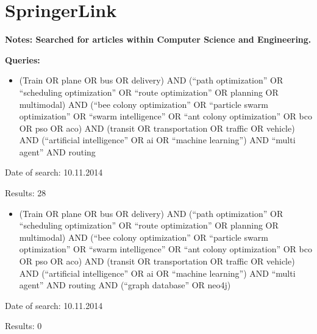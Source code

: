 \section{SpringerLink}
\textbf{Notes: Searched for articles within Computer Science and Engineering.}
\par
\textbf{Queries:}
\begin{itemize}
\item (Train OR plane OR bus OR delivery) AND (``path optimization'' OR ``scheduling optimization'' OR ``route optimization'' OR planning OR multimodal) AND (``bee colony optimization'' OR ``particle swarm optimization'' OR ``swarm intelligence'' OR ``ant colony optimization'' OR bco OR pso OR aco) AND (transit OR transportation OR traffic OR vehicle) AND (``artificial intelligence'' OR ai OR ``machine learning'') AND ``multi agent'' AND routing
\end{itemize}
\par Date of search: 10.11.2014
\par Results: 28
\begin{itemize}
\item (Train OR plane OR bus OR delivery) AND (``path optimization'' OR ``scheduling optimization'' OR ``route optimization'' OR planning OR multimodal) AND (``bee colony optimization'' OR ``particle swarm optimization'' OR ``swarm intelligence'' OR ``ant colony optimization'' OR bco OR pso OR aco) AND (transit OR transportation OR traffic OR vehicle) AND (``artificial intelligence'' OR ai OR ``machine learning'') AND ``multi agent'' AND routing AND (``graph database'' OR neo4j)
\end{itemize}
\par Date of search: 10.11.2014
\par Results: 0


